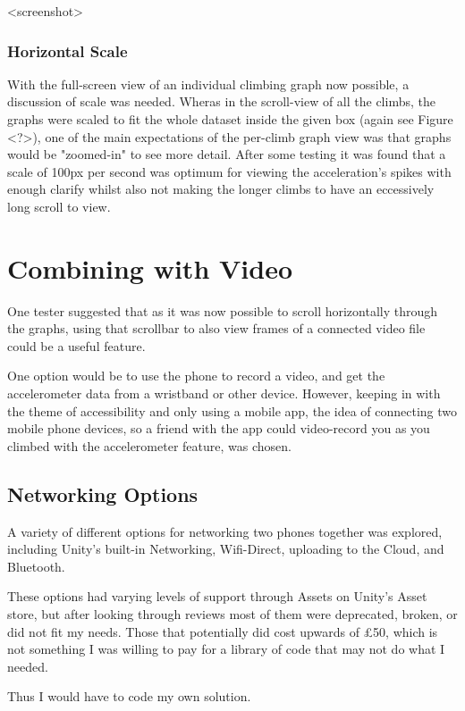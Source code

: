 <screenshot>



\subsubsection{Horizontal Scale}
With the full-screen view of an individual climbing graph now possible, a discussion of scale was needed. 
Wheras in the scroll-view of all the climbs, the graphs were scaled to fit the whole dataset inside the given box (again see Figure <?>), one of the main expectations of the per-climb graph view was that graphs would be "zoomed-in" to see more detail.
After some testing it was found that a scale of 100px per second was optimum for viewing the acceleration's spikes with enough clarify whilst also not making the longer climbs to have an eccessively long scroll to view. 



\section{Combining with Video}
One tester suggested that as it was now possible to scroll horizontally through the graphs, using that scrollbar to also view frames of a connected video file could be a useful feature.

One option would be to use the phone to record a video, and get the accelerometer data from a wristband or other device.
However, keeping in with the theme of accessibility and only using a mobile app, the idea of connecting two mobile phone devices, so a friend with the app could video-record you as you climbed with the accelerometer feature, was chosen.


\subsection{Networking Options}
A variety of different options for networking two phones together was explored, including Unity's built-in Networking, Wifi-Direct, uploading to the Cloud, and Bluetooth.


These options had varying levels of support through Assets on Unity's Asset store, but after looking through reviews most of them were deprecated, broken, or did not fit my needs.
Those that potentially did cost upwards of £50, which is not something I was willing to pay for a library of code that may not do what I needed.

Thus I would have to code my own solution.

